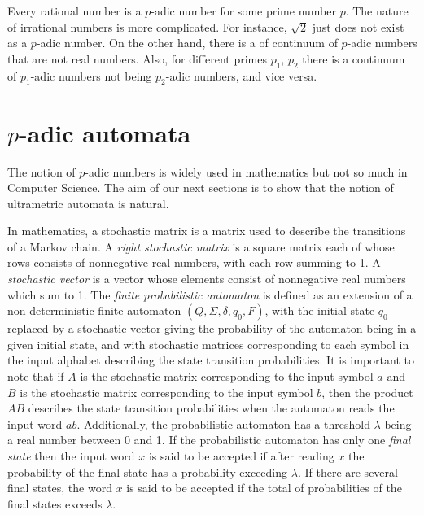 \documentclass{llncs}
\begin{document}
Every rational number is a $p$-adic number for some prime number $p$. The nature of irrational numbers is more complicated. For instance, $\sqrt{2}$ just does not exist as a $p$-adic number. On the other hand, there is a of continuum of $p$-adic numbers that are not real numbers. Also, for different primes $p_1$, $p_2$ there is a continuum of $p_1$-adic numbers not being $p_2$-adic numbers, and vice versa.

\section{$p$-adic automata}


The notion of $p$-adic numbers is widely used in mathematics but not so much in Computer Science. The aim of our next sections is to show that the notion of ultrametric automata is natural. 

In mathematics, a stochastic matrix  is a matrix used to describe the transitions of a Markov chain. A {\em right stochastic matrix}  is a square matrix each of whose rows consists of nonnegative real numbers, with each row summing to 1. A {\em stochastic vector} is a vector whose elements consist of nonnegative real numbers which sum to 1. The {\em finite probabilistic automaton} is defined as an extension of a non-deterministic finite automaton $(Q,\Sigma,\delta,q_0,F)$,  with the initial state $q_0$ replaced by a stochastic vector giving the probability of the automaton being in a given initial state, and with stochastic matrices corresponding to each symbol in the input alphabet describing the state transition probabilities. It is important to note that if $A$ is the stochastic matrix corresponding to the input symbol $a$ and $B$ is the stochastic matrix corresponding to the input symbol $b$, then the product $AB$ describes the state transition probabilities when the automaton reads the input word $ab$. Additionally, the probabilistic automaton has a threshold $\lambda $ being a real number between 0 and 1. If the probabilistic automaton has only one {\em final state} then the input word $x$ is said to be accepted if after reading $x$ the probability of the final state has a probability exceeding $\lambda $. If there are several final states, the word $x$ is said to be accepted if the total of probabilities of the final states exceeds $\lambda $.
\end{document}
